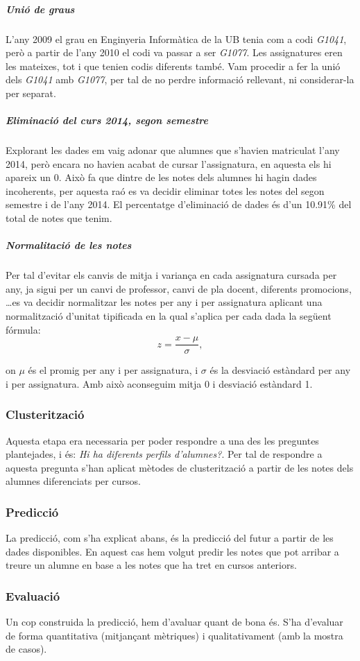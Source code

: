 \documentclass[12pt,a4paper,catalan]{article}
\begin{document}
\subparagraph{Unió de graus}
L'any 2009 el grau en Enginyeria Informàtica de la UB tenia com a codi \textit{G1041}, però a partir de l'any 2010 el codi va passar a ser \textit{G1077}. Les assignatures eren les mateixes, tot i que tenien codis diferents també. Vam procedir a fer la unió dels \textit{G1041} amb \textit{G1077}, per tal de no perdre informació rellevant, ni considerar-la per separat.

\subparagraph{Eliminació del curs 2014, segon semestre}
Explorant les dades em vaig adonar que alumnes que s'havien matriculat l'any 2014, però encara no havien acabat de cursar l'assignatura, en aquesta els hi apareix un 0. Això fa que dintre de les notes dels alumnes hi hagin dades incoherents, per aquesta raó es va decidir eliminar totes les notes del segon semestre i de l'any 2014. El percentatge d'eliminació de dades és d'un 10.91\% del total de notes que tenim.

\subparagraph{Normalitació de les notes}
Per tal d'evitar els canvis de mitja i variança en cada assignatura cursada per any, ja sigui per un canvi de professor, canvi de pla docent, diferents promocions, \ldots es va decidir normalitzar les notes per any i per assignatura aplicant una normalització d'unitat tipificada en la qual s'aplica per cada dada la següent fórmula:
$$ z = \frac{x - \mu}{\sigma}, $$

on $\mu$ és el promig per any i per assignatura, i $\sigma$ és la desviació estàndard per any i per assignatura. Amb això aconseguim mitja 0 i desviació estàndard 1.

\subsubsection{Clusterització}
Aquesta etapa era necessaria per poder respondre a una des les preguntes plantejades, i és: \textit{Hi ha diferents perfils d'alumnes?}. Per tal de  respondre a aquesta pregunta s'han aplicat mètodes de clusterització a partir de les notes dels alumnes diferenciats per cursos.

\subsubsection{Predicció}
La predicció, com s'ha explicat abans, és la predicció del futur a partir de les dades disponibles. En aquest cas hem volgut predir les notes que pot arribar a treure un alumne en base a les notes que ha tret en cursos anteriors.

\subsubsection{Evaluació}
Un cop construida la predicció, hem d'avaluar quant de bona és. S'ha d'evaluar de forma quantitativa (mitjançant mètriques) i qualitativament (amb la mostra de casos).
\end{document}
